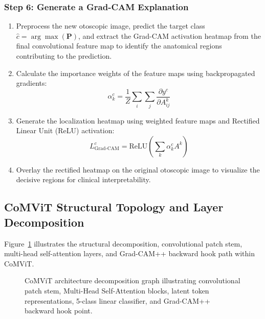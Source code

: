 \documentclass[12pt,a4paper]{report}
\renewcommand{\textbf}[1]{#1}
\begin{document}
\subsubsection*{Step 6: Generate a Grad-CAM Explanation}
\begin{enumerate}
  \item[\textbf{6.1}] Preprocess the new otoscopic image, predict the target class $\hat{c} = \arg\max(\mathbf{P})$, and extract the Grad-CAM activation heatmap from the final convolutional feature map to identify the anatomical regions contributing to the prediction.
  \item[\textbf{6.2}] Calculate the importance weights of the feature maps using backpropagated gradients:
    \begin{equation}
      \alpha_k^c = \frac{1}{Z} \sum_i \sum_j \frac{\partial y^c}{\partial A_{ij}^k}
    \end{equation}
  \item[\textbf{6.3}] Generate the localization heatmap using weighted feature maps and Rectified Linear Unit (ReLU) activation:
    \begin{equation}
      L_{\text{Grad-CAM}}^c = \mathrm{ReLU}\left( \sum_k \alpha_k^c A^k \right)
    \end{equation}
  \item[\textbf{6.4}] Overlay the rectified heatmap on the original otoscopic image to visualize the decisive regions for clinical interpretability.
\end{enumerate}

\subsection{CoMViT Structural Topology and Layer Decomposition}
Figure~\ref{fig:dag_scheduling_walkthrough} illustrates the structural decomposition, convolutional patch stem, multi-head self-attention layers, and Grad-CAM++ backward hook path within CoMViT.

\begin{figure}[H]
    \centering
    \caption{CoMViT architecture decomposition graph illustrating convolutional patch stem, Multi-Head Self-Attention blocks, latent token representations, 5-class linear classifier, and Grad-CAM++ backward hook point.}
    \label{fig:dag_scheduling_walkthrough}
\end{figure}
\end{document}
